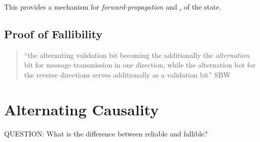 \documentclass[../../../OAE-SPEC-MAIN.tex]{subfiles}
\begin{document}
This provides a mechanism  for \emph{forward-propagation} and \href{back-propagation}, of the state.

\subsection{Proof of Fallibility}

\begin{quotation}
``the alternating validation bit becoming the additionally the \emph{alternation} bit for message transmission in one direction, while the alternation bot for the reverse directions serves additionally  as a validation bit'' SBW \cite{BSW}
\end{quotation}




\section{Alternating Causality}

QUESTION: What is the difference between reliable and fallible?



%
%
%

\end{document}

